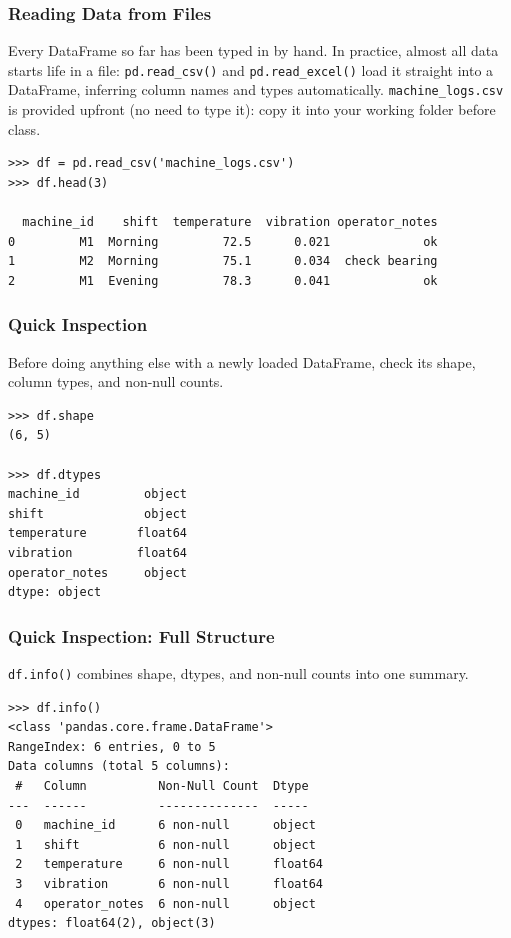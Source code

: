 \begin{frame}[fragile]\frametitle{Reading Data from Files}
Every DataFrame so far has been typed in by hand. In practice, almost all data starts life in a file: \texttt{pd.read\_csv()} and \texttt{pd.read\_excel()} load it straight into a DataFrame, inferring column names and types automatically. \texttt{machine\_logs.csv} is provided upfront (no need to type it): copy it into your working folder before class.
\begin{lstlisting}[basicstyle=\tiny\ttfamily]
>>> df = pd.read_csv('machine_logs.csv')
>>> df.head(3)

  machine_id    shift  temperature  vibration operator_notes
0         M1  Morning         72.5      0.021             ok
1         M2  Morning         75.1      0.034  check bearing
2         M1  Evening         78.3      0.041             ok
\end{lstlisting}
\end{frame}

\begin{frame}[fragile]\frametitle{Quick Inspection}
Before doing anything else with a newly loaded DataFrame, check its shape, column types, and non-null counts.
\begin{lstlisting}
>>> df.shape
(6, 5)

>>> df.dtypes
machine_id         object
shift              object
temperature       float64
vibration         float64
operator_notes     object
dtype: object
\end{lstlisting}
\end{frame}

\begin{frame}[fragile]\frametitle{Quick Inspection: Full Structure}
\texttt{df.info()} combines shape, dtypes, and non-null counts into one summary.
\begin{lstlisting}
>>> df.info()
<class 'pandas.core.frame.DataFrame'>
RangeIndex: 6 entries, 0 to 5
Data columns (total 5 columns):
 #   Column          Non-Null Count  Dtype
---  ------          --------------  -----
 0   machine_id      6 non-null      object
 1   shift           6 non-null      object
 2   temperature     6 non-null      float64
 3   vibration       6 non-null      float64
 4   operator_notes  6 non-null      object
dtypes: float64(2), object(3)
\end{lstlisting}
\end{frame}

